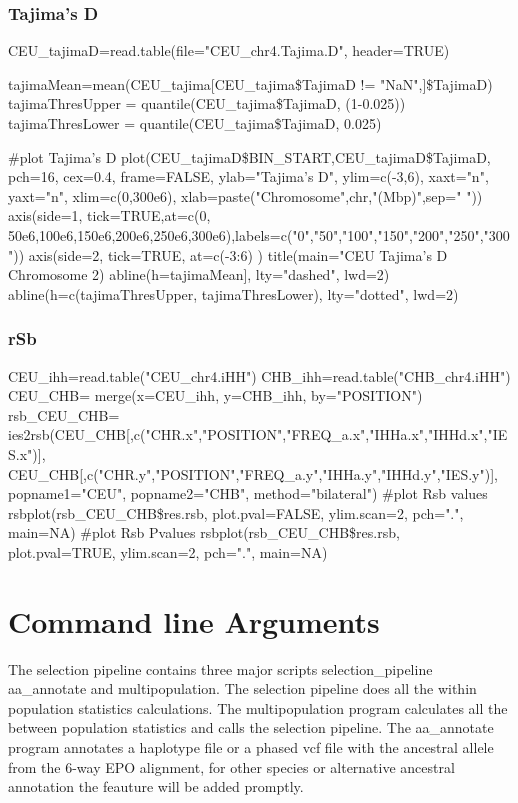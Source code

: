 \documentclass[a4paper,10pt]{article}
\begin{document}
\subsubsection{Tajima's D}
CEU\_tajimaD=read.table(file="CEU\_chr4.Tajima.D", header=TRUE)

tajimaMean=mean(CEU\_tajima[CEU\_tajima\$TajimaD != "NaN",]\$TajimaD)
tajimaThresUpper = quantile(CEU\_tajima\$TajimaD, (1-0.025))
tajimaThresLower = quantile(CEU\_tajima\$TajimaD, 0.025)

#plot Tajima's D
plot(CEU\_tajimaD\$BIN\_START,CEU\_tajimaD\$TajimaD, pch=16, cex=0.4,
       frame=FALSE, ylab="Tajima's D", ylim=c(-3,6), xaxt="n", yaxt="n",
       xlim=c(0,300e6), xlab=paste("Chromosome",chr,"(Mbp)",sep=" "))
axis(side=1, tick=TRUE,at=c(0, 50e6,100e6,150e6,200e6,250e6,300e6),labels=c("0","50","100","150","200","250","300"))
axis(side=2, tick=TRUE, at=c(-3:6) ) 
title(main="CEU Tajima's D Chromosome 2)
abline(h=tajimaMean], lty="dashed", lwd=2)
abline(h=c(tajimaThresUpper, tajimaThresLower), lty="dotted", lwd=2)




\subsubsection{rSb}
CEU\_ihh=read.table("CEU\_chr4.iHH")
CHB\_ihh=read.table("CHB\_chr4.iHH")
CEU\_CHB= merge(x=CEU\_ihh, y=CHB\_ihh, by="POSITION")
rsb\_CEU\_CHB= ies2rsb(CEU\_CHB[,c("CHR.x","POSITION","FREQ\_a.x","IHHa.x","IHHd.x","IES.x")], CEU\_CHB[,c("CHR.y","POSITION","FREQ\_a.y","IHHa.y","IHHd.y","IES.y")], 
                     popname1="CEU", popname2="CHB", method="bilateral")
#plot Rsb values
rsbplot(rsb\_CEU\_CHB\$res.rsb, plot.pval=FALSE, ylim.scan=2, pch=".", main=NA)
#plot Rsb Pvalues
rsbplot(rsb\_CEU\_CHB\$res.rsb, plot.pval=TRUE, ylim.scan=2, pch=".", main=NA)

\section{Command line Arguments}
The selection pipeline contains three major scripts selection\_pipeline aa\_annotate and multipopulation. The selection pipeline does all the within population statistics calculations. The multipopulation program calculates all the between population statistics and calls the selection pipeline. The aa\_annotate program annotates a haplotype file or a phased vcf file with the ancestral allele from the 6-way EPO alignment, for other species or alternative ancestral annotation the feauture will be added promptly.
\end{document}
